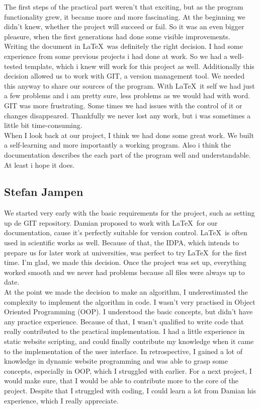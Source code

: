 The first steps of the practical part weren't that exciting, but as the program functionality grew, it became more and more fascinating. At the beginning we didn't knew, whether the project will succeed or fail. So it was an even bigger pleasure, when the first generations had done some visible improvements. \\

Writing the document in \LaTeX\ was definitely the right decision. I had some experience from some previous projects i had done at work. So we had a well-tested template, which i knew will work for this project as well. Additionally this decision allowed us to work with GIT, a version management tool. We needed this anyway to share our sources of the program. With \LaTeX\ it self we had just a few problems and i am pretty sure, less problems as we would had with word. GIT was more frustrating. Some times we had issues with the control of it or changes disappeared. Thankfully we never lost any work, but i was sometimes a little bit time-consuming.\\

When I look back at our project, I think we had done some great work. We built a self-learning and more importantly a working program. Also i think the documentation describes the each part of the program well and understandable. At least i hope it does.

\subsection{Stefan Jampen}
We started very early with the basic requirements for the project, such as setting up de GIT repository.
Damian proposed to work with \LaTeX\ for our documentation, cause it's perfectly suitable for version control. \LaTeX\ is often used in scientific works as well. Because of that, the IDPA, which intends to prepare us for later work at universities, was perfect to try \LaTeX\ for the first time. I'm glad, we made this decision. Once the project was set up, everything worked smooth and we never had problems because all files were always up to date.\\

At the point we made the decision to make an algorithm, I underestimated the complexity to implement the algorithm in code. I wasn't very practised in Object Oriented Programming (OOP). I understood the basic concepts, but didn't have any practice experience. Because of that, I wasn't qualified to write code that really contributed to the practical implementation.
I had a little experience in static website scripting, and could finally contribute my knowledge when it came to the implementation of the user interface. In retrospective, I gained a lot of knowledge in dynamic website programming and was able to grasp some concepts, especially in OOP, which I struggled with earlier. 
For a next project, I would make sure, that I would be able to contribute more to the core of the project.
Despite that I struggled with coding, I could learn a lot from Damian his experience, which I really appreciate.\\

